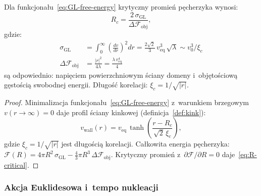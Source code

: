 \begin{proposition}\label{prop:R-critical}
Dla funkcjona\l{}u~\eqref{eq:GL-free-energy} krytyczny
promie\'n p\k{e}cherzyka wynosi:
\begin{equation}\label{eq:R-critical}
    R_c = \frac{2\,\sigma_\mathrm{GL}}{\Delta\mathcal{F}_\mathrm{obj}},
\end{equation}
gdzie:
\begin{align}
    \sigma_\mathrm{GL}
    &= \int_0^\infty \!\left(\frac{dv}{dr}\right)^2 dr
     = \frac{2\sqrt{2}}{3}\,v_{\mathrm{eq}}^3\,\sqrt{\lambda}
     \sim v_0^3/\xi_c \label{eq:sigma-GL}\\
    \Delta\mathcal{F}_\mathrm{obj}
    &= \frac{|r|^2}{4\lambda}
     = \frac{\lambda\,v_{\mathrm{eq}}^4}{4} \label{eq:DeltaF}
\end{align}
s\k{a} odpowiednio: napi\k{e}ciem powierzchniowym \'sciany
domeny i~obj\k{e}to\'sciow\k{a} g\k{e}sto\'sci\k{a} swobodnej energii.
D\l{}ugo\'s\'c korelacji: $\xi_c = 1/\sqrt{|r|}$.
\end{proposition}

\begin{proof}
Minimalizacja funkcjona\l{}u~\eqref{eq:GL-free-energy}
z~warunkiem brzegowym $v(r \to \infty) = 0$ daje profil \'sciany
kinkowej (definicja~\ref{def:kink}):
\begin{equation}\label{eq:kink-profile}
    v_\mathrm{wall}(r)
    = v_{\mathrm{eq}}\,\tanh\!\left(\frac{r - R_c}{\sqrt{2}\,\xi_c}\right),
\end{equation}
gdzie $\xi_c = 1/\sqrt{|r|}$ jest d\l{}ugo\'sci\k{a} korelacji.
Ca\l{}kowita energia p\k{e}cherzyka:
$\mathcal{F}(R) = 4\pi R^2\,\sigma_\mathrm{GL}
- \frac{4}{3}\pi R^3\,\Delta\mathcal{F}_\mathrm{obj}$.
Krytyczny promie\'n z~$\partial\mathcal{F}/\partial R = 0$
daje~\eqref{eq:R-critical}.
\end{proof}

\subsubsection{Akcja Euklidesowa i~tempo nukleacji}

